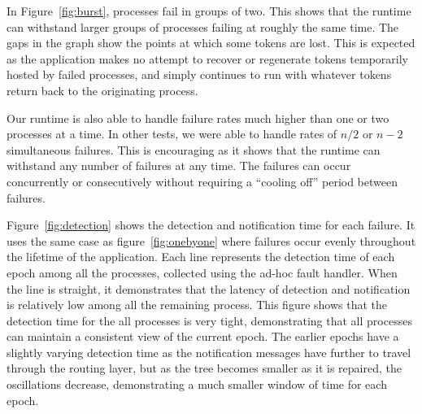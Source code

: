 In Figure~\ref{fig:burst}, processes fail in groups of two. This shows that the
runtime can withstand larger groups of processes failing at roughly the same
time.
 The gaps in the
graph show the points at which some tokens are lost. This is expected as the
application makes no attempt to recover or regenerate tokens temporarily hosted
by failed processes, and simply continues to run with whatever tokens return
back to the originating process.

%

Our runtime is also able to handle failure rates much higher than one or two
processes at a time. In other tests, we were able to handle rates of $n/2$ or
$n-2$ simultaneous failures. This is encouraging as it shows that the runtime
can withstand any number of failures at any time. The failures can occur
concurrently or consecutively without requiring a ``cooling off'' period between
failures.

Figure~\ref{fig:detection} shows the detection and notification time for each
failure. It uses the same case as figure~\ref{fig:onebyone} where failures occur
evenly throughout the lifetime of the application. Each line represents the
detection time of each epoch among all the processes, collected using the ad-hoc
fault handler. 
When the line is straight, it
demonstrates that the latency of detection and notification is
relatively low among all the remaining process. This figure shows that the
detection time for the all processes is very tight, demonstrating that all
processes can maintain a consistent view of the current epoch. The earlier
epochs have a slightly varying detection time as the notification messages have
further to travel through the routing layer, but as the tree becomes smaller as
it is repaired, the oscillations decrease, demonstrating a much smaller window
of time for each epoch.

